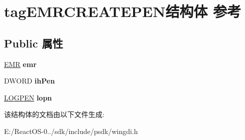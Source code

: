 \hypertarget{structtag_e_m_r_c_r_e_a_t_e_p_e_n}{}\section{tag\+E\+M\+R\+C\+R\+E\+A\+T\+E\+P\+E\+N结构体 参考}
\label{structtag_e_m_r_c_r_e_a_t_e_p_e_n}
\subsection*{Public 属性}
\begin{DoxyCompactItemize}
\item 
\mbox{\label{structtag_e_m_r_c_r_e_a_t_e_p_e_n_a3a7d4be60aae8f5d3b4357867ae0d888}} 
\hyperlink{structtag_e_m_r}{E\+MR} {\bfseries emr}
\item 
\mbox{\label{structtag_e_m_r_c_r_e_a_t_e_p_e_n_a253cd5b72859300a412737a165acf83b}} 
D\+W\+O\+RD {\bfseries ih\+Pen}
\item 
\mbox{\label{structtag_e_m_r_c_r_e_a_t_e_p_e_n_af6da97303ed09a236d6e08a77f68017c}} 
\hyperlink{structtag_l_o_g_p_e_n}{L\+O\+G\+P\+EN} {\bfseries lopn}
\end{DoxyCompactItemize}


该结构体的文档由以下文件生成\+:\begin{DoxyCompactItemize}
\item 
E\+:/\+React\+O\+S-\/0../sdk/include/psdk/wingdi.\+h\end{DoxyCompactItemize}
